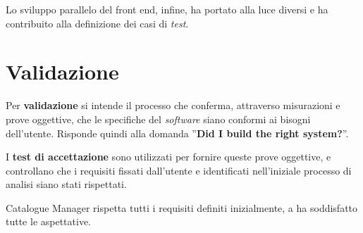 Lo sviluppo parallelo del front end, infine, ha portato alla luce diversi  e ha contribuito alla definizione dei casi di \textit{test}.

\section{Validazione}
Per \textbf{validazione} si intende il processo che conferma, attraverso misurazioni e prove oggettive, che le specifiche del \textit{software} siano conformi ai bisogni dell'utente. Risponde quindi alla domanda ''\textbf{Did I build the right system?}''.

I \textbf{test di accettazione} sono utilizzati per fornire queste prove oggettive, e controllano che i requisiti fissati dall'utente e identificati nell'iniziale processo di analisi siano stati rispettati. 

Catalogue Manager rispetta tutti i requisiti definiti inizialmente, a ha soddisfatto tutte le aspettative.